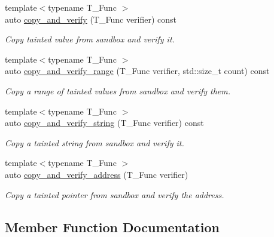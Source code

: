 \begin{DoxyCompactItemize}
{\footnotesize template$<$typename T\+\_\+\+Func $>$ }\\auto \hyperlink{classrlbox_1_1tainted__base__impl_a701759aedd637f48cc97a0e6ada1c8a6}{copy\+\_\+and\+\_\+verify} (T\+\_\+\+Func verifier) const
\begin{DoxyCompactList}\small\item\em Copy tainted value from sandbox and verify it. \end{DoxyCompactList}\item 
{\footnotesize template$<$typename T\+\_\+\+Func $>$ }\\auto \hyperlink{classrlbox_1_1tainted__base__impl_a76e49089d448ba0cfa7ef6d7c1e2d288}{copy\+\_\+and\+\_\+verify\+\_\+range} (T\+\_\+\+Func verifier, std\+::size\+\_\+t count) const
\begin{DoxyCompactList}\small\item\em Copy a range of tainted values from sandbox and verify them. \end{DoxyCompactList}\item 
{\footnotesize template$<$typename T\+\_\+\+Func $>$ }\\auto \hyperlink{classrlbox_1_1tainted__base__impl_aa377cc4d0ea6768ada5032234ac89aab}{copy\+\_\+and\+\_\+verify\+\_\+string} (T\+\_\+\+Func verifier) const
\begin{DoxyCompactList}\small\item\em Copy a tainted string from sandbox and verify it. \end{DoxyCompactList}\item 
{\footnotesize template$<$typename T\+\_\+\+Func $>$ }\\auto \hyperlink{classrlbox_1_1tainted__base__impl_ad34419b3444d0bf37e25ecf7d37fbe0b}{copy\+\_\+and\+\_\+verify\+\_\+address} (T\+\_\+\+Func verifier)
\begin{DoxyCompactList}\small\item\em Copy a tainted pointer from sandbox and verify the address. \end{DoxyCompactList}\end{DoxyCompactItemize}


\subsection{Member Function Documentation}
\mbox{\label{classrlbox_1_1tainted__base__impl_a701759aedd637f48cc97a0e6ada1c8a6}} 
